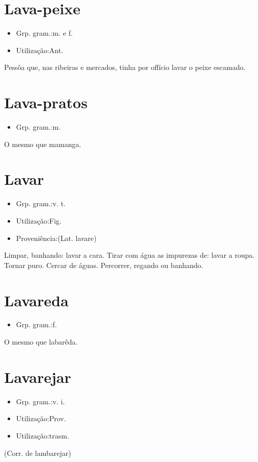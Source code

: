 \section{Lava-peixe}
\begin{itemize}
\item {Grp. gram.:m.  e  f.}
\end{itemize}
\begin{itemize}
\item {Utilização:Ant.}
\end{itemize}
Pessôa que, nas ribeiras e mercados, tinha por offício lavar o peixe escamado.
\section{Lava-pratos}
\begin{itemize}
\item {Grp. gram.:m.}
\end{itemize}
O mesmo que \textunderscore mamanga\textunderscore .
\section{Lavar}
\begin{itemize}
\item {Grp. gram.:v. t.}
\end{itemize}
\begin{itemize}
\item {Utilização:Fig.}
\end{itemize}
\begin{itemize}
\item {Proveniência:(Lat. \textunderscore lavare\textunderscore )}
\end{itemize}
Limpar, banhando: \textunderscore lavar a cara\textunderscore .
Tirar com água as impurezas de: \textunderscore lavar a roupa\textunderscore .
Tornar puro.
Cercar de águas.
Percorrer, regando ou banhando.
\section{Lavareda}
\begin{itemize}
\item {Grp. gram.:f.}
\end{itemize}
O mesmo que \textunderscore labarêda\textunderscore .
\section{Lavarejar}
\begin{itemize}
\item {Grp. gram.:v. i.}
\end{itemize}
\begin{itemize}
\item {Utilização:Prov.}
\end{itemize}
\begin{itemize}
\item {Utilização:trasm.}
\end{itemize}
(Corr. de \textunderscore lambarejar\textunderscore )
